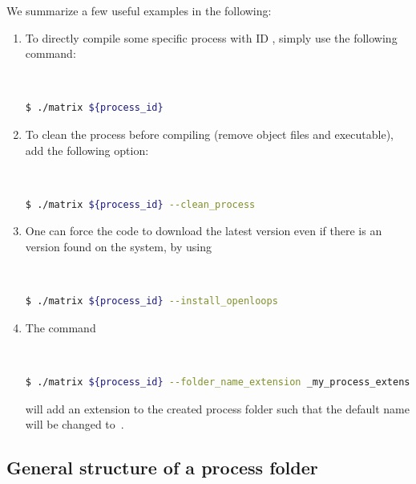 \documentclass[english,11pt]{article}
\begin{document}
We summarize a few useful examples in the following:\\[-0.8cm]
\begin{enumerate}[label={\arabic*.)}]
\item To directly compile some specific process with ID , simply use the following command:
\lstset{basicstyle=\small, frame=none}
{\tt
\begin{lstlisting}[language=bash]
 $ ./matrix ${process_id}
\end{lstlisting}
}
\item To clean the process before compiling (remove object files and executable), add the following option:
\lstset{basicstyle=\small, frame=none}
{\tt
\begin{lstlisting}[language=bash]
 $ ./matrix ${process_id} --clean_process
\end{lstlisting}
}
\item One can force the code to download the latest \OpenLoops{} version even if there is an \OpenLoops{} version found on the system, by using
\lstset{basicstyle=\small, frame=none}
{\tt
\begin{lstlisting}[language=bash]
 $ ./matrix ${process_id} --install_openloops
\end{lstlisting}
}
\item The command
\lstset{basicstyle=\small, frame=none}
{\tt
\begin{lstlisting}[language=bash]
 $ ./matrix ${process_id} --folder_name_extension _my_process_extension
\end{lstlisting}
}
will add an extension to the created process folder such that the default name will be changed to 
\,.
\end{enumerate}


\subsection{General structure of a process folder}\label{sec:folder}
\end{document}
